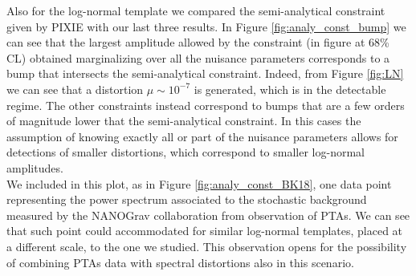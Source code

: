 Also for the log-normal template we compared the semi-analytical constraint given by PIXIE with our last three results. In Figure \ref{fig:analy_const_bump}
 we can see that the largest amplitude allowed by the constraint (in figure at 68\% CL) obtained marginalizing over all the nuisance parameters corresponds to a bump that intersects the semi-analytical constraint. Indeed, from Figure \ref{fig:LN} we can see that a distortion $\mu\sim10^{-7}$ is generated, which is in the detectable regime. The other constraints instead correspond to bumps that are a few orders of magnitude lower that the semi-analytical constraint. In this cases the assumption of knowing exactly all or part of the nuisance parameters allows for detections of smaller distortions, which correspond to smaller log-normal amplitudes.\\ We included in this plot, as in Figure \ref{fig:analy_const_BK18},  one data point representing the power spectrum associated to the stochastic background measured by the NANOGrav collaboration from observation of PTAs. We can see that such point could accommodated for similar log-normal templates, placed at a different scale, to the one we studied. This observation opens for the possibility of combining PTAs data with spectral distortions also in this scenario.







